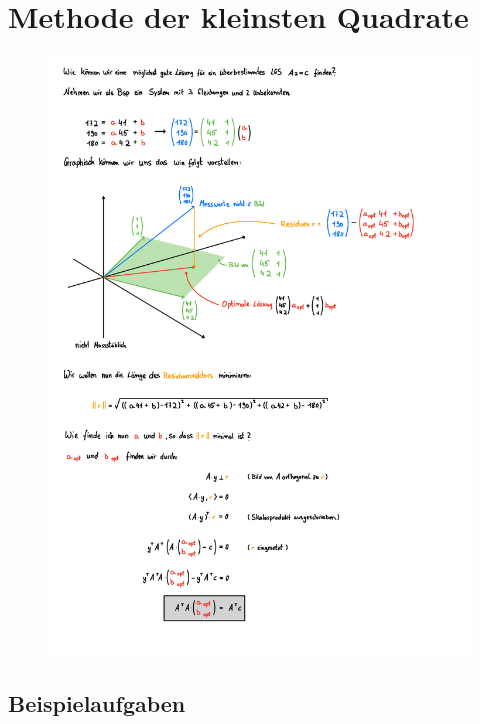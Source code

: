 \section{Methode der kleinsten Quadrate}
\begin{figure}[h!]
    \includegraphics[page=1, scale=0.842]{pdf/07_Methode_der_kleinsten_Quarate.pdf}
\end{figure}
\newpage


\subsection{Beispielaufgaben} 
\vspace{1cm}
